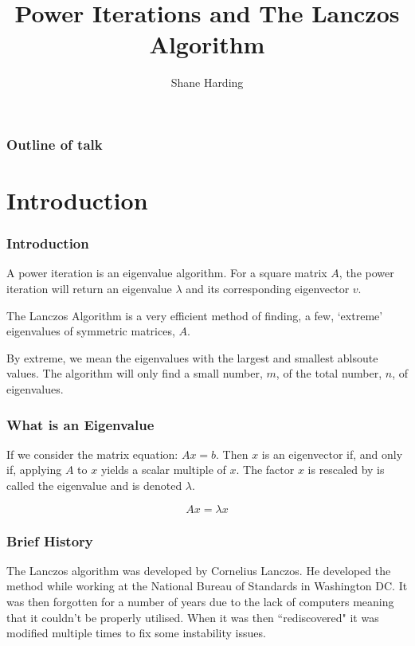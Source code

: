\documentclass[pdf]{beamer}
\title{Power Iterations and The Lanczos Algorithm}
\author{Shane Harding}
\begin{document}
\begin{frame}
\titlepage
\end{frame}


\begin{frame}
\frametitle{Outline of talk}
\tableofcontents[]

\end{frame}

\section{Introduction}

\begin{frame}
\tableofcontents[currentsection]
\end{frame}



\begin{frame}
\frametitle{Introduction}
\centering
A power iteration is an eigenvalue algorithm. For a square matrix $A$, the power iteration will return an eigenvalue $\lambda$ and its corresponding eigenvector $v$.

The Lanczos Algorithm is a very efficient method of finding, a few, `extreme' eigenvalues of symmetric matrices, $A$.

By extreme, we mean the eigenvalues with the largest and smallest ablsoute values. The algorithm will only find a small number, $m$, of the total number, $n$, of eigenvalues.

\end{frame}



\begin{frame}
\frametitle{What is an Eigenvalue}

If we consider the matrix equation: $A x = b$. Then $x$ is an eigenvector if, and only if, applying $A$ to $x$ yields a scalar multiple of $x$. The factor $x$ is rescaled by is called the eigenvalue and is denoted $\lambda$.

\[ A x = \lambda x \]

\end{frame}



\begin{frame}
\centering
\frametitle{Brief History}

The Lanczos algorithm was developed by Cornelius Lanczos. He developed the method while working at the National Bureau of Standards in Washington DC. It was then forgotten for a number of years due to the lack of computers meaning that it couldn't be properly utilised. When it was then ``rediscovered" it was modified multiple times to fix some instability issues.
\end{frame}
\end{document}
